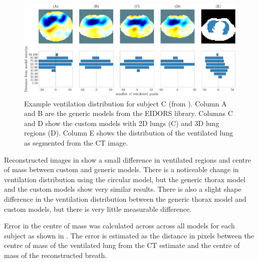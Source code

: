 \begin{figure}
	\centering
	\includegraphics[width=\textwidth]{chapter5-CT_to_mesh/imgs/center_of_vent_PT04.pdf}
	\caption[Example ventilation distributions]{\label{fig:c-of-m-results}%
	Example ventilation distribution for subject C (from ).
	Column A and B are the generic models from the EIDORS library. 
	Columns C and D show the custom models with 2D lungs (C) and 3D lung regions (D).
	Column E shows the distribution of the ventilated lung as segmented from the CT image. 
	}
\end{figure}

Reconstructed images in 
show a small difference in ventilated regions 
and centre of mass between custom and generic models. There is a 
noticeable change in ventilation distribution using the circular model, but the 
generic thorax model and the custom models show very similar results. 
There is also a slight shape difference in the ventilation distribution between the generic thorax model 
and custom models, but there is very little measurable difference. 

Error in the centre of mass was calculated across across all models for each subject 
as shown in . 
The error is estimated as the distance in pixels 
between the centre of mass of the ventilated lung from the CT estimate and the 
centre of mass of the reconstructed breath. 

